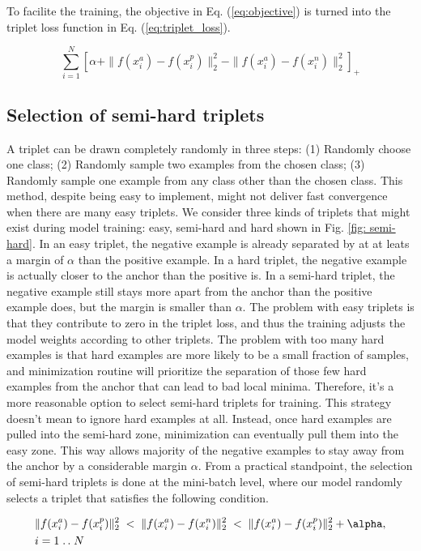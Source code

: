To facilite the training, the objective in Eq. (\ref{eq:objective}) is turned into the
triplet loss function in Eq. (\ref{eq:triplet_loss}).

\begin{equation} \label{eq:triplet_loss}
    \sum_{i=1}^{N} \left[ \alpha + \|f(x_i^a) - f(x_i^p)\|_2^2 - \|f(x_i^a) -
    f(x_i^n)\|_2^2 \right]_+
\end{equation}


\subsection{Selection of semi-hard triplets}

A triplet can be drawn completely randomly in three steps: (1) Randomly choose
one class;  (2) Randomly sample two examples from the chosen class;  (3)
Randomly sample one example from any class other than the chosen class.  This
method, despite being easy to implement, might not deliver fast convergence when
there are many easy triplets.  We consider three kinds of triplets that might
exist during model training: easy, semi-hard and hard shown in Fig. \ref{fig:
semi-hard}.  In an easy triplet, the negative example is already separated by
at at leats a margin of $\alpha$ than the positive example.  In a hard triplet,
the negative example is actually closer to the anchor than the positive is.  In
a semi-hard triplet, the negative example still stays more apart from the anchor
than the positive example does, but the margin is smaller than $\alpha$.  The
problem with easy triplets is that they contribute to zero in the triplet loss,
and thus the training adjusts the model weights according to other triplets. The
problem with too many hard examples is that hard examples are more likely to be
a small fraction of samples, and minimization routine will prioritize the
separation of those few hard examples from the anchor that can lead to bad local
minima.  Therefore, it's a more reasonable option to select semi-hard triplets
for training.  This strategy doesn't mean to ignore hard examples at all.
Instead, once hard examples are pulled into the semi-hard zone, minimization can
eventually pull them into the easy zone. This way allows majority of the
negative examples to stay away from the anchor by a considerable margin
$\alpha$.  From a practical standpoint, the selection of semi-hard triplets is
done at the mini-batch level, where our model randomly selects a triplet that
satisfies the following condition.  

\begin{equation}\label{eq: semi-hard condition}
    \begin{aligned}[b]
    &\|f(x_i^a) - f(x_i^p)\|_2^2 \;<\; \|f(x_i^a) - f(x_i^n)\|_2^2 \;<\;
    \|f(x_i^a) - f(x_i^p)\|_2^2 + \alpha, \\
    &i = 1 \isep N
    \end{aligned}
\end{equation}

